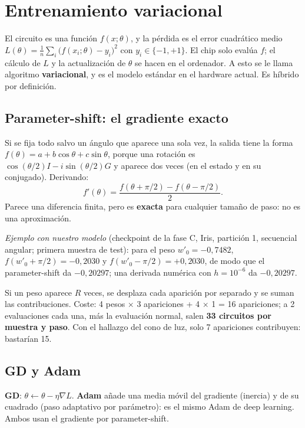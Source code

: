 \documentclass[11pt,a4paper]{article}
\begin{document}
\section{Entrenamiento variacional}

El circuito es una función $f(x;\theta)$, y la pérdida es el error cuadrático medio
$L(\theta) = \frac{1}{n}\sum_i \bigl(f(x_i;\theta) - y_i\bigr)^2$ con $y_i\in\{-1,+1\}$. El chip solo evalúa $f$; el
cálculo de $L$ y la actualización de $\theta$ se hacen en el ordenador. A esto se le llama algoritmo
\textbf{variacional}, y es el modelo estándar en el hardware actual. Es híbrido por definición.

\subsection{Parameter-shift: el gradiente exacto}

Si se fija todo salvo un ángulo que aparece una sola vez, la salida tiene la forma
$f(\theta) = a + b\cos\theta + c\sin\theta$, porque una rotación es $\cos(\theta/2)I - i\sin(\theta/2)G$ y aparece dos
veces (en el estado y en su conjugado). Derivando:
\[
  f'(\theta) = \frac{f(\theta + \pi/2) - f(\theta - \pi/2)}{2}.
\]
Parece una diferencia finita, pero es \textbf{exacta} para cualquier tamaño de paso: no es una aproximación.

\emph{Ejemplo con nuestro modelo} (checkpoint de la fase C, Iris, partición 1, secuencial angular; primera muestra de
test): para el peso $w'_0 = -0{,}7482$, $f(w'_0 + \pi/2) = -0{,}2030$ y $f(w'_0 - \pi/2) = +0{,}2030$, de modo que
el parameter-shift da $-0{,}20297$; una derivada numérica con $h = 10^{-6}$ da $-0{,}20297$.

Si un peso aparece $R$ veces, se desplaza cada aparición por separado y se suman las contribuciones. Coste:
4 pesos $\times$ 3 apariciones + 4 $\times$ 1 = 16 apariciones; a 2 evaluaciones cada una, más la evaluación normal,
salen \textbf{33 circuitos por muestra y paso}. Con el hallazgo del cono de luz, solo 7 apariciones contribuyen: bastarían 15.

\subsection{GD y Adam}
\textbf{GD}: $\theta \leftarrow \theta - \eta\nabla L$. \textbf{Adam} añade una media móvil del gradiente (inercia) y de
su cuadrado (paso adaptativo por parámetro): es el mismo Adam de deep learning. Ambos usan el gradiente por parameter-shift.
\end{document}
